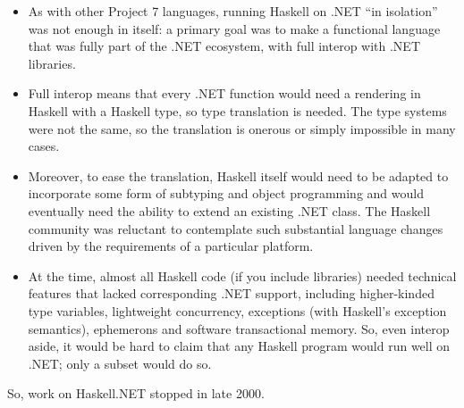 \documentclass[acmsmall]{acmart}\settopmatter{}
\begin{document}
\begin{itemize}
\item As with other Project 7 languages, running Haskell on .NET “in isolation” was not enough in itself: a primary goal was to make a functional language that
was fully part of the .NET ecosystem, with full interop with .NET libraries. 
\item Full interop means that every .NET function would need a rendering in Haskell with a Haskell type, so type translation is needed. The type systems
were not the same, so the translation is onerous or simply impossible in many cases.  
\item Moreover, to ease the translation, Haskell itself would need to be adapted to incorporate some form of subtyping and object programming and would
eventually need the ability to extend an existing .NET class.   The Haskell community was reluctant to contemplate such substantial language changes driven
by the requirements of a particular platform. 
\item At the time, almost all Haskell code (if you include libraries) needed technical features that lacked corresponding .NET support, including higher-kinded
type variables, lightweight concurrency, exceptions (with Haskell’s exception semantics), ephemerons and software transactional memory. So, even interop
aside, it would be hard to claim that any Haskell program would run well on .NET; only a subset would do so.   
\end{itemize}
So, work on Haskell.NET stopped in late 2000.
\end{document}
